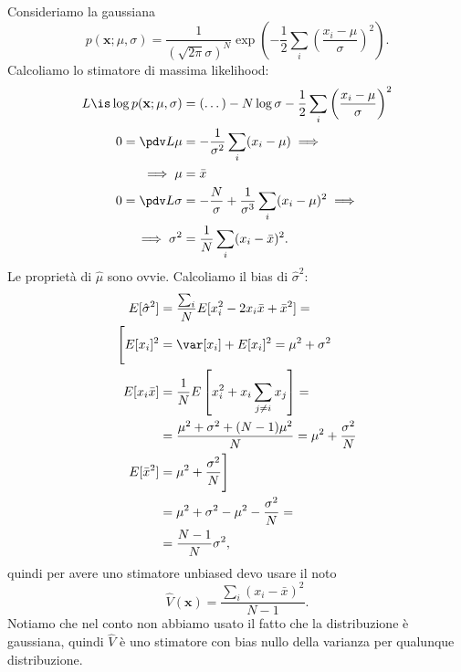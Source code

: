 \begin{example}
	Consideriamo la gaussiana
	\begin{equation*}
		p(\mathbf x;\mu,\sigma)
		= \frac1{(\sqrt{2\pi}\sigma)^N} \exp \left( -\frac12\sum_i\left(\frac{x_i-\mu}\sigma\right)^2 \right).
	\end{equation*}
	Calcoliamo lo stimatore di massima likelihood:
	\begin{align*}
		L \is \log p(\mathbf x;\mu,\sigma)
		&= (\dots) - N\log\sigma - \frac12 \sum_i \left( \frac{x_i-\mu}\sigma \right)^2 \\
		0 = \pdv L\mu
		&= -\frac1{\sigma^2}\sum_i (x_i-\mu) \implies \\
		\implies \mu
		&= \bar x \\
		0 = \pdv L\sigma
		&= -\frac N\sigma + \frac1{\sigma^3}\sum_i (x_i-\mu)^2 \implies \\
		\implies \sigma^2
		&= \frac1N \sum_i (x_i-\bar x)^2.
	\end{align*}
	Le proprietà di $\hat\mu$ sono ovvie.
	Calcoliamo il bias di $\hat\sigma^2$:
	\begin{align*}
		E[\hat\sigma^2]
		&= \frac{\sum_i}N E[x_i^2 - 2x_i\bar x + \bar x^2] = \\
		\Bigg[ E[x_i]^2
		&= \var[x_i] + E[x_i]^2
		= \mu^2 + \sigma^2 \\
		E[x_i\bar x]
		&= \frac 1N E \left[ x_i^2 + x_i \sum_{j\neq i} x_j \right] = \\
		&= \frac{\mu^2 + \sigma^2 + (N-1)\mu^2}N
		= \mu^2 + \frac{\sigma^2}N \\
		E[\bar x^2]
		&= \mu^2 + \frac{\sigma^2}N \Bigg] \\
		&= \mu^2 + \sigma^2 - \mu^2 - \frac{\sigma^2}N = \\
		&= \frac{N-1}N \sigma^2,
	\end{align*}
	quindi per avere uno stimatore unbiased devo usare il noto
	\begin{equation*}
		\hat V(\mathbf x)
		= \frac{\sum_i (x_i-\bar x)^2}{N-1}.
	\end{equation*}
	Notiamo che nel conto non abbiamo usato il fatto che la distribuzione è gaussiana,
	quindi $\hat V$ è uno stimatore con bias nullo della varianza per qualunque distribuzione.
\end{example}

